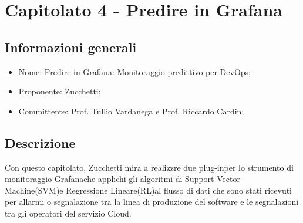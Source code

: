 \section{Capitolato 4 - Predire in Grafana}

\subsection{Informazioni generali}
\begin{itemize}
	\item Nome: Predire in Grafana\glo: Monitoraggio predittivo per DevOps\glo;
	\item Proponente: Zucchetti;
	\item Committente: Prof. Tullio Vardanega e Prof. Riccardo Cardin;
\end{itemize}

\subsection{Descrizione}
Con questo capitolato, Zucchetti mira a realizzre due plug-in\glosp per lo strumento di monitoraggio Grafana\glo che applichi gli algoritmi di Support Vector Machine(SVM)\glosp e Regressione Lineare(RL)\glosp al flusso di dati che sono stati ricevuti per allarmi o segnalazione tra la linea di produzione del software e le segnalazioni tra gli operatori del servizio Cloud\glo.

